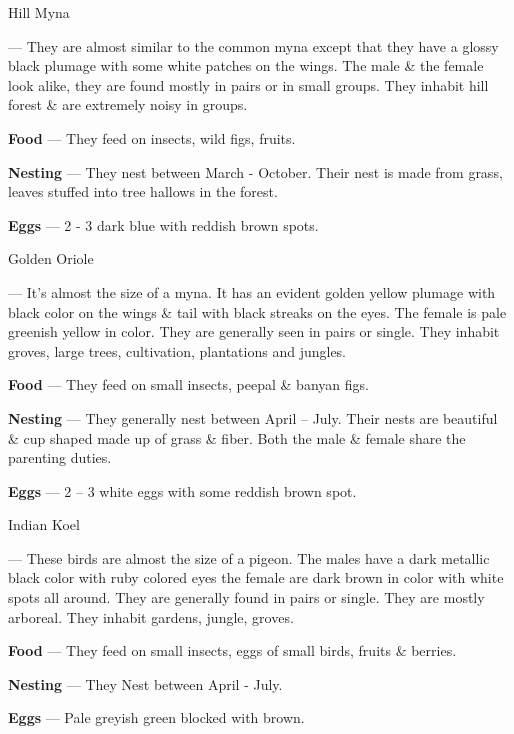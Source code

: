 \begin{bird}{Hill Myna}

 --- They are almost similar to the common myna except that they have a glossy black plumage with some white patches on the wings. The male \& the female look alike, they are found mostly in pairs or in small groups. They inhabit hill forest \& are extremely noisy in groups. 

{\large\bf Food} --- They feed on insects, wild figs, fruits.

{\large\bf Nesting} --- They nest between March - October. Their nest is made from grass, leaves stuffed into tree hallows in the forest.

{\large\bf Eggs} --- 2 - 3 dark blue with reddish brown spots.
\end{bird}

\begin{bird}{Golden Oriole}

 --- It's almost the size of a myna. It has an evident golden yellow plumage with black color on the wings \& tail with black streaks on the eyes. The female is pale greenish yellow in color. They are generally seen in pairs or single. They inhabit groves, large trees, cultivation, plantations and jungles.

{\large\bf Food} --- They feed on small insects, peepal \& banyan figs.

{\large\bf Nesting} --- They generally nest between April -- July. Their nests are beautiful \& cup shaped made up of grass \& fiber. Both the male \& female share the parenting duties.

{\large\bf Eggs} --- 2 -- 3 white eggs with some reddish brown spot.
\end{bird}

\begin{bird}{Indian Koel}

 --- These birds are almost the size of a pigeon. The males have a dark metallic black color with ruby colored eyes the female are dark brown in color with white spots all around. They are generally found in pairs or single. They are mostly arboreal. They inhabit gardens, jungle, groves.

{\large\bf Food} --- They feed on small insects, eggs of small birds, fruits \& berries. 

{\bf Nesting} --- They Nest between April - July.

{\bf Eggs} --- Pale greyish green blocked with brown.
\end{bird}

